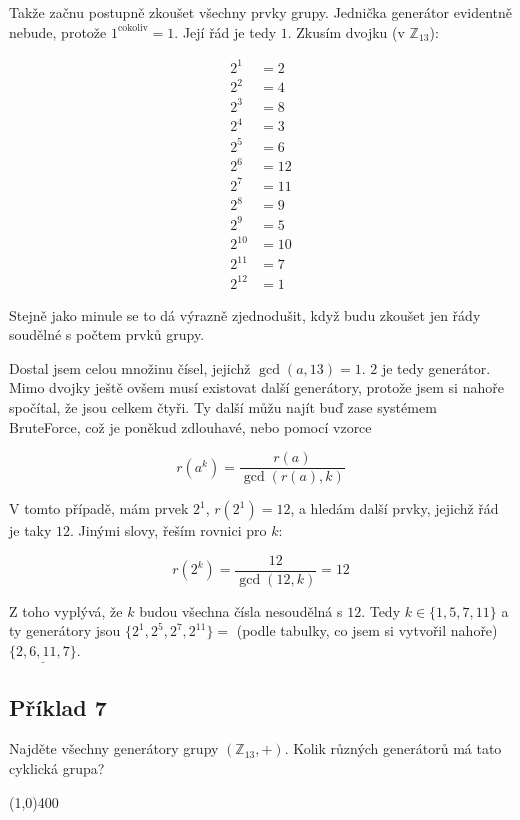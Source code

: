 \documentclass{article}
\begin{document}
Takže začnu postupně zkoušet všechny prvky grupy. Jednička generátor evidentně nebude, protože $1^{\mbox{cokoliv}} = 1$. Její řád je tedy $1$. Zkusím dvojku (v $\mathbb{Z}_{13}$):

\begin{align*}
2^1 & = 2\\
2^2 & = 4\\
2^3 & = 8\\
2^4 & = 3\\
2^5 & = 6\\
2^6 & = 12\\
2^7 & = 11\\
2^8 & = 9\\
2^9 & = 5\\
2^{10} & = 10\\
2^{11} & = 7\\
2^{12} & = 1
\end{align*}

Stejně jako minule se to dá výrazně zjednodušit, když budu zkoušet jen řády soudělné s počtem prvků grupy.

Dostal jsem celou množinu čísel, jejichž $\gcd(a,13) = 1$. $2$ je tedy generátor. Mimo dvojky ještě ovšem musí existovat další generátory, protože jsem si nahoře spočítal, že jsou celkem čtyři. Ty další můžu najít buď zase systémem BruteForce\texttrademark, což je poněkud zdlouhavé, nebo pomocí vzorce

\begin{equation}
	r(a^k) = \frac{r(a)}{\gcd(r(a), k)}
	\label{rady-prvku}
\end{equation}

V tomto případě, mám prvek $2^1$, $r(2^1) = 12$, a hledám další prvky, jejichž řád je taky $12$. Jinými slovy, řeším rovnici pro $k$:

$$r(2^k) = \frac{12}{\gcd(12, k)} = 12$$

Z toho vyplývá, že $k$ budou všechna čísla nesoudělná s $12$. Tedy $k \in \{1, 5, 7, 11\}$ a ty generátory jsou $\{2^1, 2^5, 2^7, 2^{11}\} = $ (podle tabulky, co jsem si vytvořil nahoře) $\underline{\{2, 6, 11, 7\}}$.  

\subsection{Příklad 7}
Najděte všechny generátory grupy $(\mathbb{Z}_{13},+)$. Kolik různých generátorů má tato cyklická grupa?

\line(1,0){400}
\end{document}
